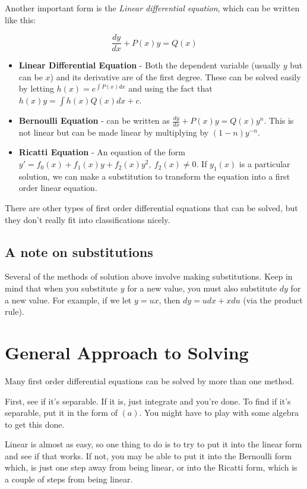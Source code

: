 \documentclass{article}
\begin{document}
Another important form is the \emph{Linear differential equation}, which can be written like this:

\[ \tag{b} \frac{dy}{dx} + P(x)y = Q(x) \]

\begin{itemize}
\item \textbf{Linear Differential Equation} - Both the dependent variable (usually $y$ but can be $x$) and its derivative are of the first degree. These can be solved easily by letting $h(x) = e^{\int{P(x)}dx}$ and using the fact that $h(x)y = \int{h(x)Q(x)}dx + c$.
\item \textbf{Bernoulli Equation} - can be written as $\tag{b} \frac{dy}{dx} + P(x)y = Q(x)y^n$. This is not linear but can be made linear by multiplying by $(1-n)y^{-n}$.
\item \textbf{Ricatti Equation} - An equation of the form $y' = f_0(x) + f_1(x)y + f_2(x)y^2,~f_2(x) \neq 0$. If $y_1(x)$ is a particular solution, we can make a substitution to transform the equation into a first order linear equation.
\end{itemize}

There are other types of first order differential equations that can be solved, but they don't really fit into classifications nicely.

\subsection{A note on substitutions}
Several of the methods of solution above involve making substitutions. Keep in mind that when you substitute $y$ for a new value, you must also substitute $dy$ for a new value. For example, if we let $y = ux$, then $dy = udx + xdu$ (via the product rule).

\section{General Approach to Solving}
Many first order differential equations can be solved by more than one method.

First, see if it's separable. If it is, just integrate and you're done. To find if it's separable, put it in the form of $(a)$. You might have to play with some algebra to get this done.

Linear is almost as easy, so one thing to do is to try to put it into the linear form and see if that works. If not, you may be able to put it into the Bernoulli form which, is just one step away from being linear, or into the Ricatti form, which is a couple of steps from being linear.
\end{document}
